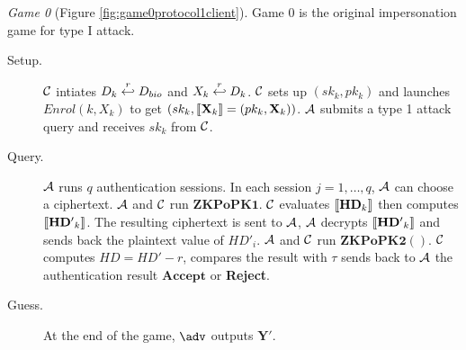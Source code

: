 \textit{Game 0} (Figure \ref{fig:game0protocol1client}). Game 0 is the original
impersonation game for type I attack.
\begin{description}
\item [Setup.] $\mathcal{C}$ intiates $D_k \stackrel{r}{\hookleftarrow} D_{bio}$ and
  $X_k \stackrel{r}{\hookleftarrow} D_k$. $\mathcal{C}$ sets up $(sk_k, pk_k)$ and launches
  $Enrol(k, X_k)$ to get $(sk_k, \left\llbracket\mathbf{X}_{k}\right\rrbracket =(pk_k, \mathbf{X}_{k}))$.
  $\mathcal{A}$ submits a type 1 attack query and receives $sk_k$ from
  $\mathcal{C}$.
\item [Query.] $\mathcal{A}$ runs $q$ authentication sessions. In each session
  $j = 1, \dots, q$, $\mathcal{A}$ can choose a ciphertext. $\mathcal{A}$ and $\mathcal{C}$ run
  $\mathbf{ZKPoPK1}$. $\mathcal{C}$ evaluates $\left\llbracket\mathbf{HD}_{k}\right\rrbracket$ then
  computes $\left\llbracket\mathbf{HD'}_{k}\right\rrbracket$. The resulting ciphertext is sent to
  $\mathcal{A}$, $\mathcal{A}$ decrypts $\left\llbracket\mathbf{HD'}_{k}\right\rrbracket$ and sends back the
  plaintext value of $HD'_{i}$. $\mathcal{A}$ and $\mathcal{C}$ run
  $\mathbf{ZKPoPK2}()$. $\mathcal{C}$ computes $HD = HD' - r$, compares the result with $\tau$ sends back to $\mathcal{A}$ the authentication result $\mathbf{Accept}$ or \textbf{Reject}.
\item [Guess.] At the end of the game, $\adv$ outputs $\mathbf{Y'}$.
\end{description}

